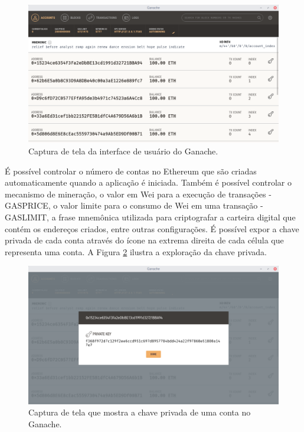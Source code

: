 \documentclass[tcc,capa]{texufpel}
\begin{document}
    \begin{figure}[h!]
        \centering
        \includegraphics[width=15cm]{imagens/ganache.png}
        \caption{Captura de tela da interface de usuário do Ganache.}
        \label{fig:screenshot-ganache}
    \end{figure}
    
    É possível controlar o número de contas no Ethereum que são criadas automaticamente quando a aplicação é iniciada. Também é possível controlar o mecanismo de mineração, o valor em Wei para a execução de transações - GASPRICE, o valor limite para o consumo de Wei em uma transação - GASLIMIT, a frase mnemônica utilizada para criptografar a carteira digital que contém os endereços criados, entre outras configurações. É possível expor a chave privada de cada conta através do ícone na extrema direita de cada célula que representa uma conta. A Figura \ref{fig:screenshot-senha-ganache} ilustra a exploração da chave privada.
    
    \begin{figure}[h!]
        \centering
        \includegraphics[width=15cm]{imagens/ganache-senha.png}
        \caption{Captura de tela que mostra a chave privada de uma conta no Ganache.}
        \label{fig:screenshot-senha-ganache}
    \end{figure}
    
\end{document}
